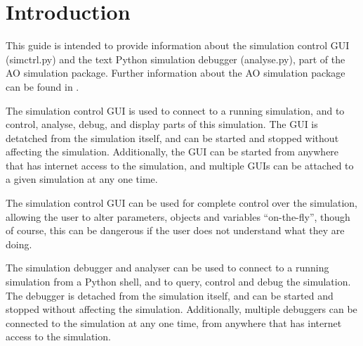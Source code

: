 \documentclass{article}
\begin{document}


\section{Introduction}
This guide is intended to provide information about the simulation
control GUI (simctrl.py) and the text Python simulation debugger
(analyse.py), part of the AO simulation package.  Further information
about the AO simulation package can be found in \citet{overview}.

The simulation control GUI is used to connect to a running
simulation, and to control, analyse, debug, and display parts of this
simulation.  The GUI is detatched from the simulation itself, and can
be started and stopped without affecting the simulation.
Additionally, the GUI can be started from anywhere that has internet
access to the simulation, and multiple GUIs can be attached to a given
simulation at any one time.

The simulation control GUI can be used for complete control over the
simulation, allowing the user to alter parameters, objects and
variables ``on-the-fly'', though of course, this can be dangerous if
the user does not understand what they are doing.  

The simulation debugger and analyser can be used to connect to a
running simulation from a Python shell, and to query, control and
debug the simulation.  The debugger is detached from the simulation
itself, and can be started and stopped without affecting the
simulation.  Additionally, multiple debuggers can be connected to the
simulation at any one time, from anywhere that has internet access to
the simulation.
\end{document}
